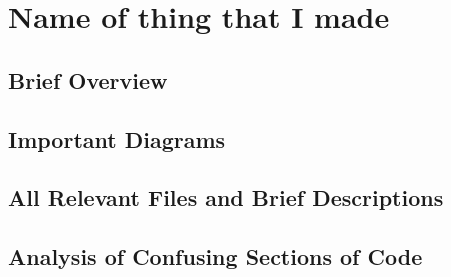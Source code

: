 \section{Name of thing that I made}

\subsection{Brief Overview}


\subsection{Important Diagrams}


\subsection{All Relevant Files and Brief Descriptions}


\subsection{Analysis of Confusing Sections of Code}


